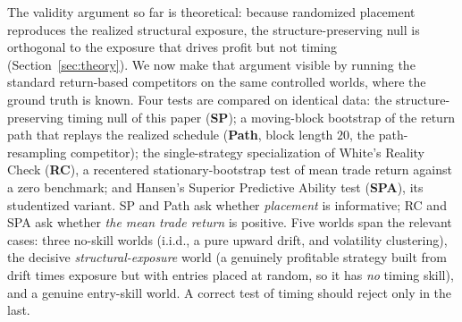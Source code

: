 \documentclass[preprint,12pt]{elsarticle}
\theoremstyle{definition}
\begin{document}
The validity argument so far is theoretical: because randomized placement reproduces the realized structural exposure, the structure-preserving null is orthogonal to the exposure that drives profit but not timing (Section~\ref{sec:theory}). We now make that argument visible by running the standard return-based competitors on the same controlled worlds, where the ground truth is known. Four tests are compared on identical data: the structure-preserving timing null of this paper (\textbf{SP}); a moving-block bootstrap of the return path that replays the realized schedule (\textbf{Path}, block length $20$, the path-resampling competitor); the single-strategy specialization of White's Reality Check \cite{white2000} (\textbf{RC}), a recentered stationary-bootstrap test of mean trade return against a zero benchmark; and Hansen's Superior Predictive Ability test \cite{hansen2005} (\textbf{SPA}), its studentized variant. SP and Path ask whether \emph{placement} is informative; RC and SPA ask whether \emph{the mean trade return} is positive. Five worlds span the relevant cases: three no-skill worlds (i.i.d., a pure upward drift, and volatility clustering), the decisive \emph{structural-exposure} world (a genuinely profitable strategy built from drift times exposure but with entries placed at random, so it has \emph{no} timing skill), and a genuine entry-skill world. A correct test of timing should reject only in the last.
\end{document}
